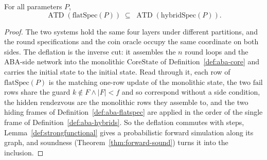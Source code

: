 \begin{theorem}
  \label{thm:aba-flatspec-refines}
  \leanok
  For all parameters $P$,
  \[
    \operatorname{ATD}(\mathrm{flatSpec}(P)) \;\subseteq\;
    \operatorname{ATD}(\mathrm{hybridSpec}(P)).
  \]
\end{theorem}

\begin{proof}\leanok
  The two systems hold the same four layers under different partitions, and the round specifications and the coin oracle occupy the same coordinate on both sides.
  The deflation  is the inverse cut: it assembles the $n$ round loops and the ABA-side network into the monolithic $\mathrm{CoreState}$ of Definition~\ref{def:aba-core} and carries the initial state to the initial state.
  Read through it, each row of $\mathrm{flatSpec}(P)$ is the matching one-row update of the monolithic state, the two $\mathrm{fail}$ rows share the guard $k \notin F \wedge |F| < f$ and so correspond without a side condition, the hidden rendezvous are the monolithic rows they assemble to, and the two hiding frames of Definition~\ref{def:aba-flatspec} are applied in the order of the single frame of Definition~\ref{def:aba-hybrids}.
  So the deflation commutes with steps, Lemma~\ref{def:strongfunctional} gives a probabilistic forward simulation along its graph, and soundness (Theorem~\ref{thm:forward-sound}) turns it into the inclusion.
\end{proof}

